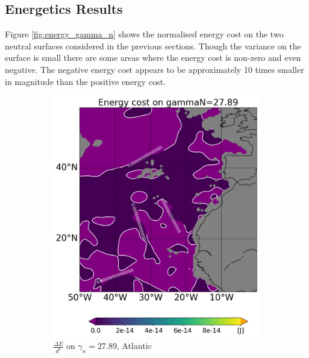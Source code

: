 \subsection{Energetics Results}
\label{subsection:energeticsresults}

Figure \ref{fig:energy_gamma_n} shows the normalised energy cost on the two neutral surfaces considered in the previous sections. Though the variance on the surface is small there are some areas where the energy cost is non-zero and even negative. The negative energy cost appears to be approximately 10 times smaller in magnitude than the positive energy cost.

\begin{figure}[htbp]
    \centering
     \begin{subfigure}[b]{0.4\textwidth}
         
         \includegraphics[width=\textwidth]{plots/energy/atlantic_energy/Map2dcyl_energy_on_gammaN_2789e-2_reg310Eto360E05Nto57N_1990to1998av_WOCE.png}
         \caption{$\frac{\Delta E}{d^2}$ on $\gamma_n = 27.89$, Atlantic}
         \label{fig:subplot_atlantic_energy_gamma_n}
     \end{subfigure}
     \hfill
     \begin{subfigure}[b]{0.4\textwidth}
         

\end{subfigure}
\end{figure}
